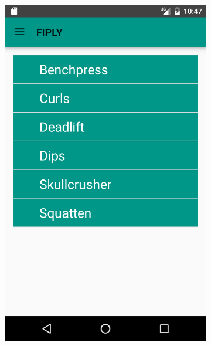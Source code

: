 \documentclass[FIPLY_base.tex]{subfiles}
\begin{document}
\begin{figure}
	\begin{subfigure}[b]{0.3\textwidth}
	\includegraphics[scale=0.20]{img/Uebungskatalog}
	\end{subfigure}
	\hfil
	\begin{subfigure}[b]{0.3\textwidth}

\end{subfigure}
\end{figure}
\end{document}
